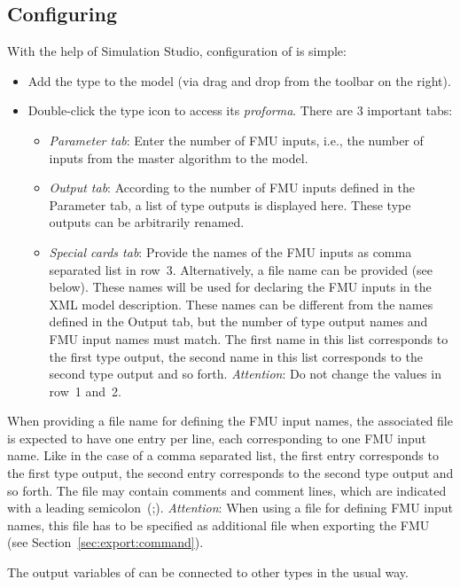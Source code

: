 \subsection{Configuring \typea}
With the help of Simulation Studio, configuration of \typea is simple:
\begin{itemize}
  \item Add the type to the model (via drag and drop from the toolbar on the right).
  \item Double-click the type icon to access its \emph{proforma}.
  There are 3 important tabs:
  \begin{itemize}
    \item \emph{Parameter tab}: Enter the number of FMU inputs, i.e., the number of inputs from the master algorithm to the \trnsys model.
    \item \emph{Output tab}: According to the number of FMU inputs defined in the Parameter tab, a list of type outputs is displayed here.
    These type outputs can be arbitrarily renamed.
    \item \emph{Special cards tab}: Provide the names of the FMU inputs as comma separated list in row~3.
    Alternatively, a file name can be provided (see below). 
    These names will be used for declaring the FMU inputs in the XML model description.
    These names can be different from the names defined in the Output tab, but the number of type output names and FMU input names must match.
    The first name in this list corresponds to the first type output, the second name in this list corresponds to the second type output and so forth. 
    \emph{Attention}: Do not change the values in row~1 and~2.
  \end{itemize}
\end{itemize}

When providing a file name for defining the FMU input names, the associated file is expected to have one entry per line, each corresponding to one FMU input name.
Like in the case of a comma separated list, the first entry corresponds to the first type output, the second entry corresponds to the second type output and so forth.
The file may contain comments and comment lines, which are indicated with a leading semicolon~(;).
\emph{Attention}: When using a file for defining FMU input names, this file has to be specified as additional file when exporting the FMU (see Section~\ref{sec:export:command}).

The output variables of \typea can be connected to other \trnsys types in the usual way.

